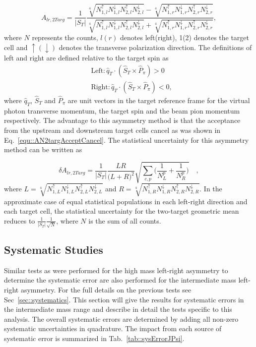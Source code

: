 \begin{equation}
  \label{equ::AN4TargGeomeanJPsi}
  A_{lr,2Targ} =
  \frac{1}{|S_T|}
  \frac{ \sqrt[4]{ N_{1,l}^\uparrow N_{1, l}^\downarrow
      N_{2,l}^\uparrow N_{2, l}^\downarrow }
    - \sqrt[4]{ N_{1,r}^\uparrow N_{1,r}^\downarrow
      N_{2,r}^\uparrow N_{2,r}^\downarrow }
  }{
    \sqrt[4]{ N_{1,l}^\uparrow N_{1, l}^\downarrow
      N_{2,l}^\uparrow N_{2, l}^\downarrow }
    + \sqrt[4]{ N_{1,r}^\uparrow N_{1,r}^\downarrow
      N_{2,r}^\uparrow N_{2,r}^\downarrow } },
\end{equation}
\noindent
where $N$ represents the counts, $l(r)$ denotes left(right), 1(2) denotes the
target cell and $\uparrow(\downarrow)$ denotes the transverse polarization
direction.  The definitions of left and right are defined relative to the target
spin as
\begin{equation}
  \begin{aligned}
    &\text{Left}: \hat{q}_T \cdot (\hat{S}_T \times \hat{P}_{\pi}) > 0 \\
    &\text{Right}: \hat{q}_T \cdot (\hat{S}_T \times \hat{P}_{\pi}) < 0, 
  \end{aligned}
\end{equation}
\noindent
where $\hat{q}_T$, $\hat{S}_T$ and $\hat{P}_{\pi}$ are unit vectors in the
target reference frame for the virtual photon transverse momentum, the target
spin and the beam pion momentum respectively.  The advantage to this asymmetry
method is that the acceptance from the upstream and downstream target cells
cancel as was shown in Eq.~\ref{equ::AN2targAcceptCancel}.  The statistical
uncertainty for this asymmetry method can be written as

\begin{equation}
  \delta A_{lr,2Targ} = \frac{1}{|S_T|}
  \frac{LR}{\Big( L+R \Big)^2}
  \sqrt{
    \sum_{c,p}
    \Big(
    \frac{1}{N_L^{p}}
    + \frac{1}{N_R^p}
    \Big)
  } \quad,
\end{equation}
where $L =\sqrt[4]{N_{1,L}^\uparrow N_{1,L}^\downarrow N_{2,L}^\uparrow
  N_{2,L}^\downarrow}$ and $R =\sqrt[4]{N_{1,R}^\uparrow N_{1,R}^\downarrow
  N_{2,R}^\uparrow N_{2,R}^\downarrow}$.  In the approximate case of equal
statistical populations in each left-right direction and each target cell, the
statistical uncertainty for the two-target geometric mean reduces to
$\frac{1}{|S_T|}\frac{1}{\sqrt{N}}$, where $N$ is the sum of all counts.

\subsection{Systematic Studies}
Similar tests as were performed for the high mass left-right asymmetry to
determine the systematic error are also performed for the intermediate mass
left-right asymmetry.  For the full details on the previous tests see
Sec~\ref{sec::systematics}.  This section will give the results for systematic
errors in the intermediate mass range and describe in detail the tests specific
to this analysis.  The overall systematic errors are determined by adding all
non-zero systematic uncertainties in quadrature.  The impact from each source of
systematic error is summarized in Tab.~\ref{tab::sysErrorJPsi}.

